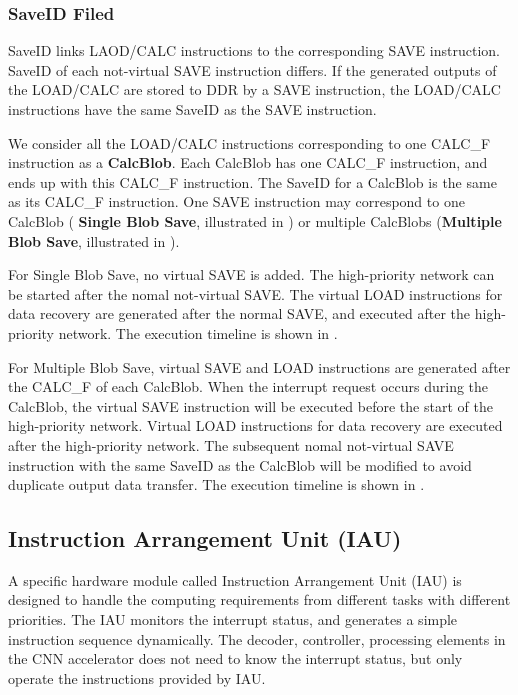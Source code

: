 \subsubsection{ SaveID Filed }

SaveID links LAOD/CALC instructions to the corresponding SAVE instruction. SaveID of each not-virtual SAVE instruction differs. If the generated outputs of the LOAD/CALC are stored to DDR by a SAVE instruction, the LOAD/CALC instructions have the same SaveID as the SAVE instruction.

We consider all the LOAD/CALC instructions corresponding to one CALC\_F instruction as a \textbf{CalcBlob}. Each CalcBlob has one CALC\_F instruction, and ends up with this CALC\_F instruction. The SaveID for a CalcBlob is the same as its CALC\_F instruction.
One SAVE instruction may correspond to one CalcBlob ( \textbf{Single Blob Save}, illustrated in  ) or multiple CalcBlobs (\textbf{Multiple Blob Save}, illustrated in ).

For Single Blob Save, no virtual SAVE is added. The high-priority network can be started after the nomal not-virtual SAVE. The virtual LOAD instructions for data recovery are generated after the normal SAVE, and executed after the high-priority network. The execution timeline is shown in .

For Multiple Blob Save, virtual SAVE and LOAD instructions are generated after the CALC\_F of each CalcBlob. When the interrupt request occurs during the CalcBlob, the virtual SAVE instruction will be executed before the start of the high-priority network. Virtual LOAD instructions for data recovery are executed after the high-priority network. The subsequent nomal not-virtual SAVE instruction with the same SaveID as the CalcBlob will be modified to avoid duplicate output data transfer. The execution timeline is shown in .








\subsection{ Instruction Arrangement Unit (IAU) }

A specific hardware module called Instruction Arrangement Unit (IAU) is designed to handle the computing requirements from different tasks with different priorities. The IAU monitors the interrupt status, and generates a simple instruction sequence dynamically. The decoder, controller, processing elements in the CNN accelerator does not need to know the interrupt status, but only operate the instructions provided by IAU.

